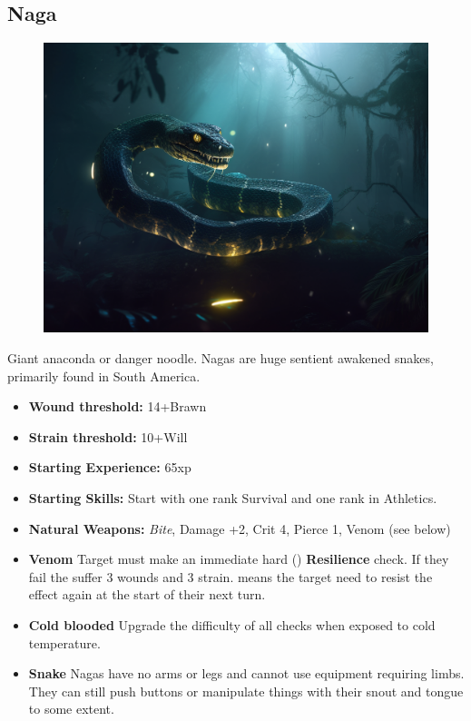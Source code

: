 \documentclass{book}
\begin{document}
\begin{multicols}{2}
	\subsection{Naga}
	\begin{figure}[H]
		\includegraphics[width=0.7\linewidth]{images/naga}
	\end{figure}
	
	Giant anaconda or danger noodle. Nagas are huge sentient awakened snakes, primarily found in South America.
	
	\begin{itemize}
		\item \textbf{Wound threshold:} 14+Brawn
		\item \textbf{Strain threshold:} 10+Will
		\item \textbf{Starting Experience:} 65xp
		\item \textbf{Starting Skills:} Start with one rank Survival and one rank in Athletics.
		\item \textbf{Natural Weapons:} \textit{Bite}, Damage +2, Crit 4, Pierce 1, Venom (see below)
		\item \textbf{Venom} Target must make an immediate hard (\DifficultyDie \DifficultyDie \DifficultyDie) \textbf{Resilience} check. If they fail the suffer 3 wounds and 3 strain. \Threat \Threat \Threat means the target need to resist the effect again at the start of their next turn.
		\item \textbf{Cold blooded} Upgrade the difficulty of all checks when exposed to cold temperature.
		\item \textbf{Snake} Nagas have no arms or legs and cannot use equipment requiring limbs. They can still push buttons or manipulate things with their snout and tongue to some extent.
	\end{itemize}
	

\end{multicols}
\end{document}
